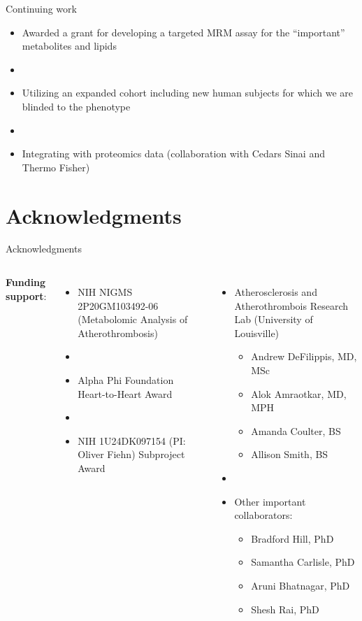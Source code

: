 \documentclass[xcolor=dvipsnames]{beamer}
\begin{document}
\begin{frame}{Continuing work}
	\vspace{-7pt}
	\begin{itemize}
		\item Awarded a grant for developing a targeted MRM assay for the ``important'' metabolites and lipids \pause
		\item[]
		\item Utilizing an expanded cohort including new human subjects for which we are blinded to the phenotype \pause
		\item[]
		\item Integrating with proteomics data (collaboration with Cedars Sinai and Thermo Fisher)
	\end{itemize}
\end{frame}

\section{Acknowledgments}

\begin{frame}{Acknowledgments}
	\begin{columns}
			\textbf{Funding support}:
			\begin{itemize}
				\item NIH NIGMS 2P20GM103492-06 (Metabolomic Analysis of Atherothrombosis)
				\item[]
				\item Alpha Phi Foundation Heart-to-Heart Award
				\item[]
				\item NIH 1U24DK097154 (PI: Oliver Fiehn) Subproject Award
			\end{itemize}
			\begin{itemize}
				\item Atherosclerosis and Atherothrombois Research Lab (University of Louisville)
				\begin{itemize}
					\item Andrew DeFilippis, MD, MSc
					\item Alok Amraotkar, MD, MPH
					\item Amanda Coulter, BS
					\item Allison Smith, BS
				\end{itemize}
				\item[]
				\item Other important collaborators:
				\begin{itemize}
					\item Bradford Hill, PhD
					\item Samantha Carlisle, PhD
					\item Aruni Bhatnagar, PhD
					\item Shesh Rai, PhD
				\end{itemize}
			\end{itemize}
	\end{columns}
\end{frame}
\end{document}
